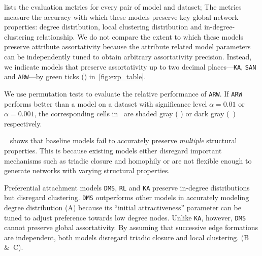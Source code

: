  lists the evaluation metrics for every pair of model
and dataset; The metrics measure the accuracy with which these models
preserve key global network properties: degree distribution, local clustering distribution
and in-degree-clustering relationship. We do not compare the extent to which these models preserve attribute assortativity because the attribute related model parameters can be independently tuned to obtain arbitrary assortativity precision. Instead, we indicate models that preserve assortativity up to two decimal
places---\texttt{KA}, \texttt{SAN} and \texttt{ARW}---by green ticks (\checkmark) in~\cref{fig:exp_table}.

We use permutation tests \cite{good2013permutation} to evaluate the relative
performance of \texttt{ARW}. If
\texttt{ARW} performs better than a model on a dataset with significance level
$\alpha=0.01$ or $\alpha=0.001$, the corresponding cells in~
are shaded gray ( \lightgraybg{ }) or dark gray (~\darkgraybg{ }) respectively.


~ shows that baseline models fail to accurately preserve \textit{multiple} structural properties. This is because existing models either disregard important mechanisms such as triadic closure and homophily or are not flexible enough to generate networks with varying structural properties.


Preferential attachment models \texttt{DMS}, \texttt{RL}
and \texttt{KA} preserve in-degree distributions but disregard
clustering. \texttt{DMS} outperforms other models in accurately modeling
degree distribution (A) because its ``initial attractiveness''
parameter can be tuned to adjust preference towards low degree nodes. Unlike \texttt{KA}, however,
\texttt{DMS} cannot preserve global assortativity.
By assuming that successive edge formations are independent, both models disregard
triadic closure and local clustering. (B \&~C).

